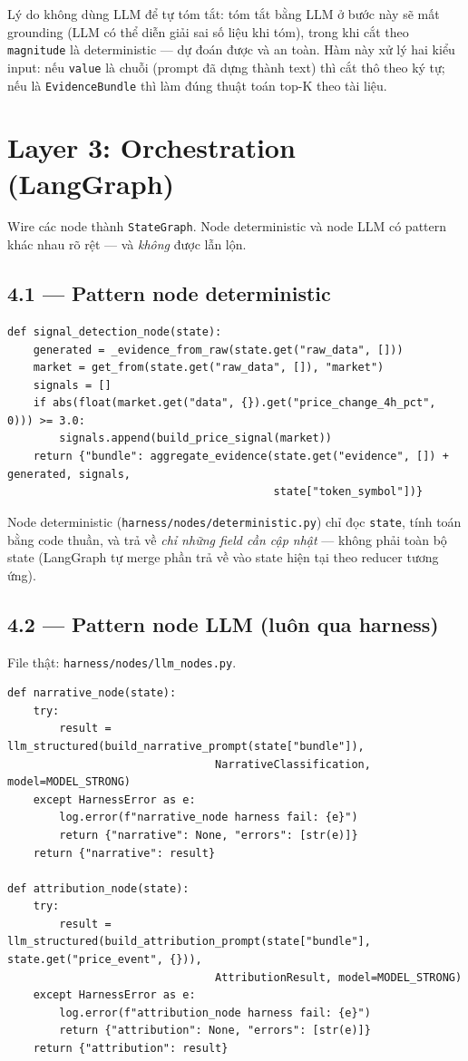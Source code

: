 \documentclass[12pt,a4paper]{article}
\newcommand{\file}[1]{\texttt{#1}}
\begin{document}
Lý do không dùng LLM để tự tóm tắt: tóm tắt bằng LLM ở bước này sẽ mất grounding (LLM có thể diễn
giải sai số liệu khi tóm), trong khi cắt theo \texttt{magnitude} là deterministic --- dự đoán
được và an toàn. Hàm này xử lý hai kiểu input: nếu \texttt{value} là chuỗi (prompt đã dựng thành
text) thì cắt thô theo ký tự; nếu là \texttt{EvidenceBundle} thì làm đúng thuật toán top-K theo
tài liệu.

\section{Layer 3: Orchestration (LangGraph)}

Wire các node thành \texttt{StateGraph}. Node deterministic và node LLM có pattern khác nhau rõ
rệt --- và \emph{không} được lẫn lộn.

\subsection{4.1 --- Pattern node deterministic}

\begin{lstlisting}
def signal_detection_node(state):
    generated = _evidence_from_raw(state.get("raw_data", []))
    market = get_from(state.get("raw_data", []), "market")
    signals = []
    if abs(float(market.get("data", {}).get("price_change_4h_pct", 0))) >= 3.0:
        signals.append(build_price_signal(market))
    return {"bundle": aggregate_evidence(state.get("evidence", []) + generated, signals,
                                         state["token_symbol"])}
\end{lstlisting}

Node deterministic (\file{harness/nodes/deterministic.py}) chỉ đọc \texttt{state}, tính toán bằng
code thuần, và trả về \emph{chỉ những field cần cập nhật} --- không phải toàn bộ state (LangGraph
tự merge phần trả về vào state hiện tại theo reducer tương ứng).

\subsection{4.2 --- Pattern node LLM (luôn qua harness)}

File thật: \file{harness/nodes/llm\_nodes.py}.

\begin{lstlisting}
def narrative_node(state):
    try:
        result = llm_structured(build_narrative_prompt(state["bundle"]),
                                NarrativeClassification, model=MODEL_STRONG)
    except HarnessError as e:
        log.error(f"narrative_node harness fail: {e}")
        return {"narrative": None, "errors": [str(e)]}
    return {"narrative": result}

def attribution_node(state):
    try:
        result = llm_structured(build_attribution_prompt(state["bundle"], state.get("price_event", {})),
                                AttributionResult, model=MODEL_STRONG)
    except HarnessError as e:
        log.error(f"attribution_node harness fail: {e}")
        return {"attribution": None, "errors": [str(e)]}
    return {"attribution": result}
\end{lstlisting}
\end{document}
